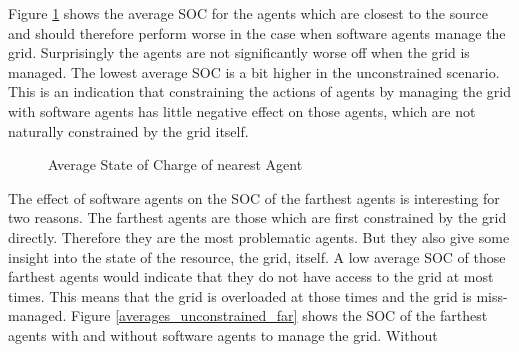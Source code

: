 \documentclass[a4paper]{article}
\begin{document}
Figure \ref{averages_unconstrained_near} shows the average SOC for the agents which are closest to the source and should therefore 
perform worse in the case when software agents manage the grid. Surprisingly the agents are not significantly worse off when the 
grid is managed. The lowest average SOC is a bit higher in the unconstrained scenario. 
This is an indication that constraining the actions of agents by managing the grid with software agents has little negative 
effect on those agents, which are not naturally constrained by the grid itself.\\
\begin{figure}[!ht]
\caption{Average State of Charge of nearest Agent}
\label{averages_unconstrained_near}
\end{figure}
The effect of software agents on the SOC of the farthest agents is interesting for two reasons. The farthest agents are those which 
are first constrained by the grid directly. Therefore they are the most problematic agents. But they also give some insight into 
the state of the resource, the grid, itself. A low average SOC of those farthest agents would indicate that they do not have access to 
the grid at most times. This means that the grid is overloaded at those times and the grid is miss-managed. Figure
\ref{averages_unconstrained_far} shows the SOC of the farthest agents with and without software agents to manage the grid. Without 
\end{document}
